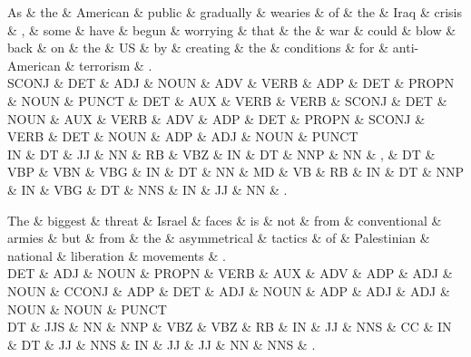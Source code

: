 \begin{dependency}
\begin{deptext}
As \& the \& American \& public \& gradually \& wearies \& of \& the \& Iraq \& crisis \& , \& some \& have \& begun \& worrying \& that \& the \& war \& could \& blow \& back \& on \& the \& US \& by \& creating \& the \& conditions \& for \& anti-American \& terrorism \& . \\
SCONJ \& DET \& ADJ \& NOUN \& ADV \& VERB \& ADP \& DET \& PROPN \& NOUN \& PUNCT \& DET \& AUX \& VERB \& VERB \& SCONJ \& DET \& NOUN \& AUX \& VERB \& ADV \& ADP \& DET \& PROPN \& SCONJ \& VERB \& DET \& NOUN \& ADP \& ADJ \& NOUN \& PUNCT \\
IN \& DT \& JJ \& NN \& RB \& VBZ \& IN \& DT \& NNP \& NN \& , \& DT \& VBP \& VBN \& VBG \& IN \& DT \& NN \& MD \& VB \& RB \& IN \& DT \& NNP \& IN \& VBG \& DT \& NNS \& IN \& JJ \& NN \& . \\
\end{deptext}



\end{dependency}

\begin{dependency}
\begin{deptext}
The \& biggest \& threat \& Israel \& faces \& is \& not \& from \& conventional \& armies \& but \& from \& the \& asymmetrical \& tactics \& of \& Palestinian \& national \& liberation \& movements \& . \\
DET \& ADJ \& NOUN \& PROPN \& VERB \& AUX \& ADV \& ADP \& ADJ \& NOUN \& CCONJ \& ADP \& DET \& ADJ \& NOUN \& ADP \& ADJ \& ADJ \& NOUN \& NOUN \& PUNCT \\
DT \& JJS \& NN \& NNP \& VBZ \& VBZ \& RB \& IN \& JJ \& NNS \& CC \& IN \& DT \& JJ \& NNS \& IN \& JJ \& JJ \& NN \& NNS \& . \\
\end{deptext}



\end{dependency}

